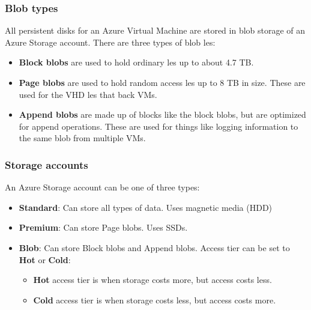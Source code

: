 \documentclass[12pt]{article}
\begin{document}
\subsubsection{Blob types}
All persistent disks for an Azure Virtual Machine are stored in blob storage of an Azure Storage account. There are three types of blob  les:
\begin{itemize}
    \item \textbf{Block blobs} are used to hold ordinary  les up to about 4.7 TB.
    \item \textbf{Page blobs} are used to hold random access  les up to 8 TB in size. These are used for the
    VHD  les that back VMs.
    \item \textbf{Append blobs} are made up of blocks like the block blobs, but are optimized for append operations. These are used for things like logging information to the same blob from multiple VMs.
\end{itemize}

\subsubsection{Storage accounts}
An Azure Storage account can be one of three types:
\begin{itemize}
    \item \textbf{Standard}: Can store all types of data. Uses magnetic media (HDD)
    \item \textbf{Premium}: Can store Page blobs. Uses SSDs. 
    \item \textbf{Blob}: Can store Block blobs and Append blobs. Access tier can be set to \textbf{Hot} or \textbf{Cold}: 
    \begin{itemize}
        \item \textbf{Hot} access tier is when storage costs more, but access costs less.
        \item \textbf{Cold} access tier is when storage costs less, but access costs more.
    \end{itemize}
\end{itemize}
\end{document}
